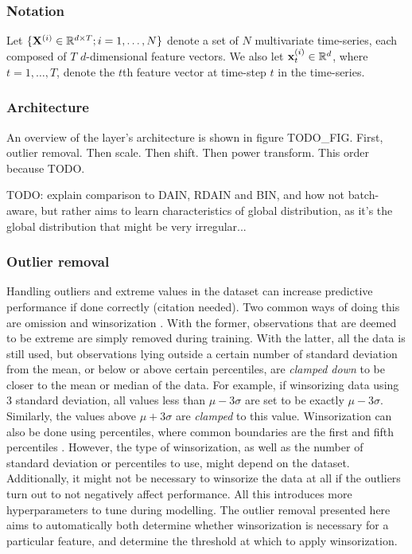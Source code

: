 \documentclass{statsmsc}
\begin{document}
\subsubsection{Notation}%
\label{ssub:Notation}


Let $\{\mathbf{X}^{(i)} \in \mathbb{R}^{d \times T};i=1,\dots,N\}$ denote a set of $N$ multivariate time-series,
each composed of $T$ $d$-dimensional feature vectors. We also let $\mathbf{x}_t^{(i)}\in \mathbb{R}^d$,
where $t=1,\dots,T$, denote the $t$th feature vector at time-step $t$ in the time-series.

\subsubsection{Architecture}%
\label{ssub:Architecture}


An overview of the layer's architecture is shown in figure TODO\_FIG.
First, outlier removal. Then scale. Then shift. Then power transform.
This order because TODO.

TODO: explain comparison to DAIN, RDAIN and BIN, and how not batch-aware, but rather aims to
learn characteristics of global distribution, as it's the global distribution that might be
very irregular...

\subsubsection{Outlier removal}%
\label{ssub:Outlier removal}

Handling outliers and extreme values in the dataset can increase predictive performance if done
correctly (citation needed). Two common ways of doing this are omission and winsorization
\citep{winsorization}. With the former, observations that are deemed to be extreme are simply
removed during training. With the latter, all the data is still used, but observations lying
outside a certain number of standard deviation from the mean, or below or above certain
percentiles, are \textit{clamped down} to be closer to the mean or median of the data.
For example, if winsorizing data using 3 standard deviation, all values less than
$\mu-3\sigma$ are set to be exactly $\mu-3\sigma$. Similarly, the values above
$\mu+3\sigma$ are \textit{clamped} to this value. Winsorization can also be done using percentiles,
where common boundaries are the first and fifth percentiles \cite{winsorization}.
However, the type of winsorization, as well as the number of standard deviation
or percentiles to use, might depend on the dataset. Additionally, it might not
be necessary to winsorize the data at all if the outliers turn out to not
negatively affect performance. All this introduces more hyperparameters to tune
during modelling. The outlier removal presented here aims to automatically both determine
whether winsorization is necessary for a particular feature, and determine the threshold at
which to apply winsorization.
\end{document}
